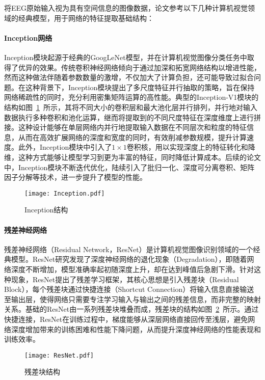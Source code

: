 将EEG原始输入视为具有空间信息的图像数据，论文参考以下几种计算机视觉领域的经典模型，用于网络的特征提取基础结构：

\paragraph{Inception网络}

Inception模块起源于经典的GoogLeNet模型\cite{szegedy2015going}，并在计算机视觉图像分类任务中取得了优异的效果。传统卷积神经网络倾向于通过加深和拓宽网络结构以增进性能，然而这种做法伴随着参数数量的激增，不仅加大了计算负担，还可能导致过拟合问题。在这种背景下，Inception模块提出了多尺度特征并行抽取的策略，旨在保持网络稀疏性的同时，充分利用密集矩阵运算的高性能。典型的Inception-V1模块的结构如图~\ref{fig:Inception}~所示，其将不同大小的卷积层和最大池化层并行排列，并行地对输入数据执行多种卷积和池化运算，继而将提取到的不同尺度特征在深度维度上进行拼接。这种设计能够在单层网络内并行地提取输入数据在不同层次和粒度的特征信息，从而在高效扩展网络的深度和宽度的同时，有效削减参数规模，提升计算速度。此外，Inception模块中引入了\(1\times1\)卷积核，用以实现深度上的特征转化和降维，这种方式能够让模型学习到更为丰富的特征，同时降低计算成本。后续的论文中，Inception模块不断迭代优化，陆续引入了批归一化、深度可分离卷积、矩阵因子分解等技术，进一步提升了模型的性能\cite{szegedy2016rethinking,szegedy2017inception}。
\begin{figure}
  \centering
  \texttt{[image: Inception.pdf]}
  \caption{Inception结构\cite{szegedy2015going}}
  \label{fig:Inception}
\end{figure}

\paragraph{残差神经网络}

残差神经网络（Residual Network，ResNet）\cite{he2016deep}是计算机视觉图像识别领域的一个经典模型。ResNet研究发现了深度神经网络的退化现象（Degradation），即随着网络深度不断增加，模型准确率起初随深度上升，却在达到峰值后急剧下滑。针对这种现象，ResNet提出了残差学习框架，其核心思想是引入残差块（Residual Block），每个残差块通过快捷连接（Shortcut Connection）将输入信息直接输送至输出层，使得网络只需要专注学习输入与输出之间的残差信息，而非完整的映射关系。基础的ResNet由一系列残差块堆叠而成，残差块的结构如图~\ref{fig:ResNet}~所示。通过快捷连接，ResNet在训练过程中，梯度能够从深层网络直接回传至浅层，避免网络深度增加带来的训练困难和性能下降问题，从而提升深度神经网络的性能表现和训练效率。
\begin{figure}
  \centering
  \texttt{[image: ResNet.pdf]}
  \caption{残差块结构\cite{he2016deep}}
  \label{fig:ResNet}
\end{figure}

